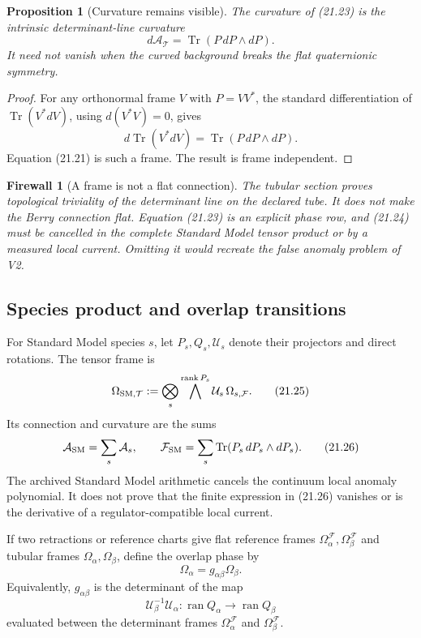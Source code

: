 \documentclass[11pt]{article}
\newtheorem{proposition}[theorem]{Proposition}
\newtheorem{firewall}[theorem]{Firewall}
\newcommand{\Tr}{\operatorname{Tr}}
\begin{document}
\begin{proposition}[Curvature remains visible]
\label{prop:v11v21-curvature}
The curvature of (21.23) is the intrinsic determinant-line curvature
\[
 d\mathcal A_{\mathcal T}
 =
 \Tr(P\,dP\wedge dP).
 \tag{21.24}
\]
It need not vanish when the curved background breaks the flat
quaternionic symmetry.
\end{proposition}

\begin{proof}
For any orthonormal frame \(V\) with \(P=VV^*\), the standard
differentiation of \(\Tr(V^*dV)\), using
\(d(V^*V)=0\), gives
\[
 d\Tr(V^*dV)=\Tr(P\,dP\wedge dP).
\]
Equation (21.21) is such a frame.  The result is frame independent.
\end{proof}

\begin{firewall}[A frame is not a flat connection]
\label{fw:v11v21-not-flat}
The tubular section proves topological triviality of the determinant line
on the declared tube.  It does not make the Berry connection flat.
Equation (21.23) is an explicit phase row, and (21.24) must be cancelled
in the complete Standard Model tensor product or by a measured local
current.  Omitting it would recreate the false anomaly problem of V2.
\end{firewall}

\subsection{Species product and overlap transitions}

For Standard Model species \(s\), let \(P_s,Q_s,\mathcal U_s\) denote
their projectors and direct rotations.  The tensor frame is
\[
 \Omega_{\rm SM,\mathcal T}
 :=
 \bigotimes_s
 \bigwedge^{\operatorname{rank}P_s}\mathcal U_s\,
 \Omega_{s,\mathcal F}.
 \tag{21.25}
\]
Its connection and curvature are the sums
\[
 \mathcal A_{\rm SM}=\sum_s\mathcal A_s,
 \qquad
 \mathcal F_{\rm SM}=\sum_s\Tr(P_s\,dP_s\wedge dP_s).
 \tag{21.26}
\]
The archived Standard Model arithmetic cancels the continuum local anomaly
polynomial.  It does not prove that the finite expression in (21.26)
vanishes or is the derivative of a regulator-compatible local current.

If two retractions or reference charts give flat reference frames
\(\Omega_\alpha^{\mathcal F},\Omega_\beta^{\mathcal F}\) and tubular
frames \(\Omega_\alpha,\Omega_\beta\), define the overlap phase by
\[
 \Omega_\alpha=g_{\alpha\beta}\Omega_\beta.
 \tag{21.27}
\]
Equivalently, \(g_{\alpha\beta}\) is the determinant of the map
\[
 \mathcal U_\beta^{-1}\mathcal U_\alpha:
 \operatorname{ran}Q_\alpha\longrightarrow\operatorname{ran}Q_\beta
\]
evaluated between the determinant frames
\(\Omega_\alpha^{\mathcal F}\) and
\(\Omega_\beta^{\mathcal F}\).
\end{document}
